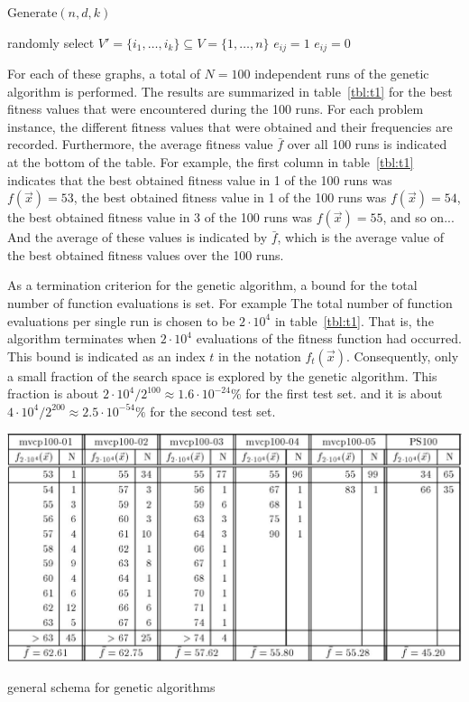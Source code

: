 \documentclass[12pt]{article}
\begin{document}
\begin{algorithm}
\caption{Generate$(n, d, k)$}
\label{alg:gen}
\begin{algorithmic}[1]


\State randomly select $V' = \{i_1, \dots, i_k\} \subseteq V = \{1, \dots, n\}$
\State
{}
\State $e_{ij} = 1$
\Else
\State $e_{ij} = 0$
\EndIf
\EndFor
\EndFor


\end{algorithmic}
\end{algorithm}

For each of these graphs, a total of
$N = 100$ independent runs of the genetic algorithm is performed.
The results are summarized in table~\ref{tbl:t1} for the best
fitness values that were encountered during the 100 runs.
For each problem instance, the different fitness values that were
obtained and their frequencies are recorded.
Furthermore, the average fitness value $\bar{f}$ over
all 100 runs is indicated at the bottom of the table.
For example, the first column in table~\ref{tbl:t1} indicates
that the best obtained fitness value in 1 of the 100 runs was $f(\vec{x}) = 53$,
the best obtained fitness value in 1 of the 100 runs was $f(\vec{x}) = 54$,
the best obtained fitness value in 3 of the 100 runs was $f(\vec{x}) = 55$, and so on...
And the average of these values is indicated by $\bar{f}$, which is the average value of
the best obtained fitness values over the 100 runs.

As a termination criterion for the genetic algorithm, a bound for the total number of function evaluations is set.
For example The total number of function evaluations per single run is chosen to be $2 \cdot 10^4$ in table~\ref{tbl:t1}.
That is, the algorithm terminates when $2 \cdot 10^4$ evaluations of the fitness function
had occurred.
This bound is indicated as an index $t$ in the notation $f_t(\vec{x})$.
Consequently, only a small fraction of the search space is explored by the genetic algorithm.
This fraction is about $ 2 \cdot 10^4 / 2^{100} \approx 1.6 \cdot 10^{-24} \% $ for the first test set.
and it is about $ 4 \cdot 10^4 / 2^{200} \approx 2.5 \cdot 10^{-54} \% $ for the second test set.

\begin{table}[!htbp]
\centering
\includegraphics[width=1\textwidth]{t1}
\caption{general schema for genetic algorithms}
\label{tbl:t1}
\end{table}
\end{document}
